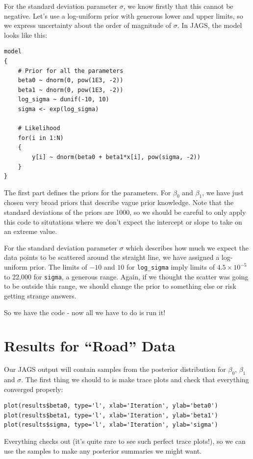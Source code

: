 For the standard deviation parameter $\sigma$, we know firstly that this cannot
be negative. Let's use a log-uniform prior with generous lower and upper limits,
so we express uncertainty about the order of magnitude of $\sigma$.
In JAGS, the model looks like this:
\begin{framed}
\begin{verbatim}
model
{
    # Prior for all the parameters
    beta0 ~ dnorm(0, pow(1E3, -2))
    beta1 ~ dnorm(0, pow(1E3, -2))
    log_sigma ~ dunif(-10, 10)
    sigma <- exp(log_sigma)

    # Likelihood
    for(i in 1:N)
    {
        y[i] ~ dnorm(beta0 + beta1*x[i], pow(sigma, -2))
    }
}
\end{verbatim}
\end{framed}
The first part defines the priors for the parameters. For $\beta_0$ and $\beta_1$,
we have just chosen very broad priors that describe vague prior knowledge. Note
that the standard deviations of the priors are 1000, so we should be careful
to only apply this code to situtations where we don't expect the intercept or
slope to take on an extreme value.

For the standard deviation parameter $\sigma$ which describes how much we
expect the data points to be scattered around the straight line, we have assigned
a log-uniform prior. The limits of $-10$ and $10$ for {\tt log\_sigma} imply
limits of $4.5 \times 10^{-5}$ to 22,000 for {\tt sigma}, a generous range.
Again, if we thought the scatter
was going to be outside this range, we should change the prior to something
else or risk getting strange answers.

So we have the code - now all we have to do is run it!

\section{Results for ``Road'' Data}
Our JAGS output will contain samples from the posterior distribution for
$\beta_0$, $\beta_1$ and $\sigma$. The first thing we should to is make
trace plots and check that everything converged properly:
\begin{framed}
\begin{verbatim}
plot(results$beta0, type='l', xlab='Iteration', ylab='beta0')
plot(results$beta1, type='l', xlab='Iteration', ylab='beta1')
plot(results$sigma, type='l', xlab='Iteration', ylab='sigma')
\end{verbatim}
\end{framed}
Everything checks out (it's quite rare to see such perfect trace plots!), so
we can use the samples to make any posterior summaries we might want.

